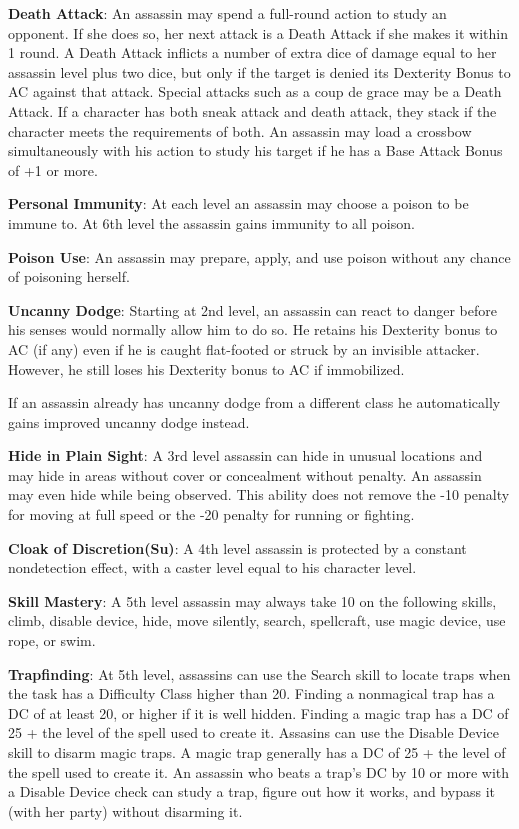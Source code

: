 \textbf{Death Attack}: An assassin may spend a full-round action to study an opponent. If she does so, her next attack is a Death Attack if she makes it within 1 round. A Death Attack inflicts a number of extra dice of damage equal to her assassin level plus two dice, but only if the target is denied its Dexterity Bonus to AC against that attack. Special attacks such as a coup de grace may be a Death Attack. If a character has both sneak attack and death attack, they stack if the character meets the requirements of both. An assassin may load a crossbow simultaneously with his action to study his target if he has a Base Attack Bonus of +1 or more.

\textbf{Personal Immunity}: At each level an assassin may choose a poison to be immune to. At 6th level the assassin gains immunity to all poison.

\textbf{Poison Use}: An assassin may prepare, apply, and use poison without any chance of poisoning herself.

\textbf{Uncanny Dodge}: Starting at 2nd level, an assassin can react to danger before his senses would normally allow him to do so. He retains his Dexterity bonus to AC (if any) even if he is caught flat-footed or struck by an invisible attacker. However, he still loses his Dexterity bonus to AC if immobilized. 

If an assassin already has uncanny dodge from a different class he automatically gains improved uncanny dodge instead.

\textbf{Hide in Plain Sight}: A 3rd level assassin can hide in unusual locations and may hide in areas without cover or concealment without penalty. An assassin may even hide while being observed. This ability does not remove the -10 penalty for moving at full speed or the -20 penalty for running or fighting.

\textbf{Cloak of Discretion(Su)}: A 4th level assassin is protected by a constant nondetection effect, with a caster level equal to his character level.

\textbf{Skill Mastery}: A 5th level assassin may always take 10 on the following skills, climb, disable device, hide, move silently, search, spellcraft, use magic device, use rope, or swim.

\textbf{Trapfinding}: At 5th level, assassins can use the Search skill to locate traps when the task has a Difficulty Class higher than 20. Finding a nonmagical trap has a DC of at least 20, or higher if it is well hidden. Finding a magic trap has a DC of 25 + the level of the spell used to create it. Assasins can use the Disable Device skill to disarm magic traps. A magic trap generally has a DC of 25 + the level of the spell used to create it. An assassin who beats a trap’s DC by 10 or more with a Disable Device check can study a trap, figure out how it works, and bypass it (with her party) without disarming it.

